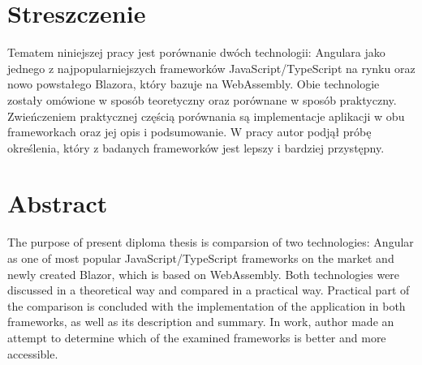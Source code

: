 \documentclass[12pt,a4paper,oneside]{book}
\begin{document}
\setcounter{page}{2}
\section*{Streszczenie}
Tematem niniejszej pracy jest porównanie dwóch technologii: Angulara jako jednego z najpopularniejszych frameworków JavaScript/TypeScript na rynku oraz nowo powstałego Blazora, który bazuje na WebAssembly. Obie technologie zostały omówione w sposób teoretyczny oraz porównane w sposób praktyczny. Zwieńczeniem praktycznej częścią porównania są implementacje aplikacji w obu frameworkach oraz jej opis i podsumowanie. W pracy autor podjął próbę określenia, który z badanych frameworków jest lepszy i bardziej przystępny.

\section*{Abstract}
The purpose of present diploma thesis is comparsion of two technologies: Angular as one of most popular JavaScript/TypeScript frameworks on the market and newly created Blazor, which is based on WebAssembly. Both technologies were discussed in a theoretical way and compared in a practical way. Practical part of the comparison is concluded with the implementation of the application in both frameworks, as well as its description and summary. In work, author made an attempt to determine which of the examined frameworks is better and more accessible. 

\tableofcontents
\newpage

\end{document}
